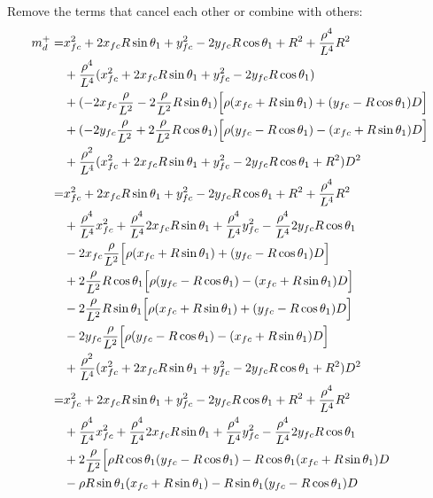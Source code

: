 \documentclass[12pt]{article}
\begin{document}
Remove the terms that cancel each other or combine with others:
\begin{align}
    m_d^+=& x_{fc}^2 +2x_{fc}R\sin\theta_1 + y_{fc}^2 -2y_{fc}R\cos\theta_1 + R^2 + \frac{\rho^4}{L^4}R^2 \nonumber\\
    &+  \frac{\rho^4}{L^4}( x_{fc}^2 + 2x_{fc}R\sin\theta_1 + y_{fc}^2 -2y_{fc}R\cos\theta_1) \nonumber\\
    &+ (-2x_{fc}\frac{\rho}{L^2} -2\frac{\rho}{L^2}R\sin\theta_1)\Bigl[\rho(x_{fc} + R\sin\theta_1) + (y_{fc}-R\cos\theta_1)D\Bigr] \nonumber\\
    &+ (-2y_{fc}\frac{\rho}{L^2} +2\frac{\rho}{L^2}R\cos\theta_1)\Bigl[\rho(y_{fc}-R\cos\theta_1) - (x_{fc} + R\sin\theta_1)D\Bigr] \nonumber\\
    &+\frac{\rho^2}{L^4}(x_{fc}^2 + 2x_{fc}R\sin\theta_1 + y_{fc}^2 -2y_{fc}R\cos\theta_1 +  R^2 )D^2  \\
    =& x_{fc}^2 +2x_{fc}R\sin\theta_1 + y_{fc}^2 -2y_{fc}R\cos\theta_1 + R^2 + \frac{\rho^4}{L^4}R^2 \nonumber\\
    &+   \frac{\rho^4}{L^4}x_{fc}^2 + \frac{\rho^4}{L^4}2x_{fc}R\sin\theta_1 + \frac{\rho^4}{L^4}y_{fc}^2 -\frac{\rho^4}{L^4}2y_{fc}R\cos\theta_1 \nonumber\\
    &-2x_{fc}\frac{\rho}{L^2}\Bigl[\rho(x_{fc} + R\sin\theta_1) + (y_{fc}-R\cos\theta_1)D\Bigr] \nonumber\\
    &+ 2\frac{\rho}{L^2}R\cos\theta_1\Bigl[\rho(y_{fc}-R\cos\theta_1) - (x_{fc} + R\sin\theta_1)D\Bigr] \nonumber\\
    &-2\frac{\rho}{L^2}R\sin\theta_1\Bigl[\rho(x_{fc} + R\sin\theta_1) + (y_{fc}-R\cos\theta_1)D\Bigr] \nonumber\\
    &-2y_{fc}\frac{\rho}{L^2}\Bigl[\rho(y_{fc}-R\cos\theta_1) - (x_{fc} + R\sin\theta_1)D\Bigr] \nonumber\\
    &+\frac{\rho^2}{L^4}(x_{fc}^2 + 2x_{fc}R\sin\theta_1 + y_{fc}^2 -2y_{fc}R\cos\theta_1 +  R^2 )D^2\\
    =& x_{fc}^2 +2x_{fc}R\sin\theta_1 + y_{fc}^2 -2y_{fc}R\cos\theta_1 + R^2 + \frac{\rho^4}{L^4}R^2 \nonumber\\
    &+   \frac{\rho^4}{L^4}x_{fc}^2 + \frac{\rho^4}{L^4}2x_{fc}R\sin\theta_1 + \frac{\rho^4}{L^4}y_{fc}^2 -\frac{\rho^4}{L^4}2y_{fc}R\cos\theta_1 \nonumber\\
    &+ 2\frac{\rho}{L^2}\Bigl[\rho R\cos\theta_1(y_{fc}-R\cos\theta_1) - R\cos\theta_1(x_{fc} + R\sin\theta_1)D \nonumber\\
    &-\rho R\sin\theta_1(x_{fc} + R\sin\theta_1) - R\sin\theta_1(y_{fc}-R\cos\theta_1)D \nonumber\\

\end{align}
\end{document}

